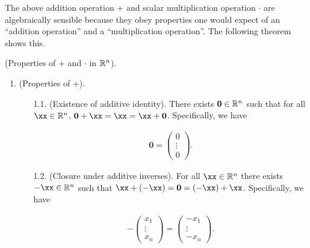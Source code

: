 The above addition operation $+$ and scalar multiplication operation $\cdot$ are algebraically sensible because they obey properties one would expect of an ``addition operation'' and a ``multiplication operation''. The following theorem shows this.

\newpage

\begin{theorem}
\label{ch::lin_alg::thm::prop_operations_Rn}
    (Properties of $+$ and $\cdot$ in $\mathbb{R}^n$).
        \begin{enumerate}
            \item (Properties of $+$).
            \begin{enumerate}
                \item[1.1.] (Existence of additive identity). There exists $\mathbf{0} \in \mathbb{R}^n$ such that for all $\xx \in \R^n$, $\mathbf{0} + \xx = \xx = \xx + \mathbf{0}$. Specifically, we have
        
                \begin{align*}
                    \mathbf{0} = \begin{pmatrix} 0 \\ \vdots \\ 0 \end{pmatrix}.
                \end{align*}
                
                \item[1.2.] (Closure under additive inverses). For all $\xx \in \R^n$ there exists $-\xx \in \R^n$ such that $\xx + (-\xx) = \mathbf{0} = (-\xx) + \xx$. Specifically, we have
        
                \begin{align*}
                    -\begin{pmatrix}
                        x_1 \\ \vdots \\ x_n
                    \end{pmatrix}
                    =
                    \begin{pmatrix}
                        -x_1 \\ \vdots \\ -x_n
                    \end{pmatrix}.
                \end{align*}
        

\end{enumerate}
\end{enumerate}
\end{theorem}
